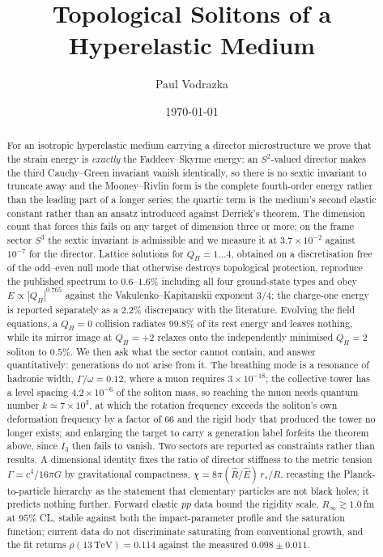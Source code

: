 \documentclass[aps,prd,preprint,nofootinbib,longbibliography]{revtex4-2}
\newcommand{\Qh}{Q_H}
\newcommand{\Ehat}{\hat{E}}
\newcommand{\Rhat}{\hat{R}}
\begin{document}
\title{Topological Solitons of a Hyperelastic Medium}

\author{Paul Vodrazka}

\date{\today}

\begin{abstract}
For an isotropic hyperelastic medium carrying a director microstructure we prove
that the strain energy is \emph{exactly} the Faddeev--Skyrme energy: an
$S^2$-valued director makes the third Cauchy--Green invariant vanish identically,
so there is no sextic invariant to truncate away and the Mooney--Rivlin form is
the complete fourth-order energy rather than the leading part of a longer series;
the quartic term is the medium's second elastic constant rather than an ansatz
introduced against Derrick's theorem. The dimension count that forces this fails on any
target of dimension three or more; on the frame sector $S^3$ the sextic invariant
is admissible and we measure it at $3.7\times10^{-2}$ against $10^{-7}$ for the
director. Lattice solutions for $\Qh=1\ldots4$, obtained on a discretisation free
of the odd--even null mode that otherwise destroys topological protection,
reproduce the published spectrum to $0.6$--$1.6\%$ including all four
ground-state types and obey $E\propto|\Qh|^{0.765}$ against the
Vakulenko--Kapitanskii exponent $3/4$; the charge-one energy is reported
separately as a $2.2\%$ discrepancy with the literature. Evolving the field
equations, a $\Qh=0$ collision radiates $99.8\%$ of its rest energy and leaves
nothing, while its mirror image at $\Qh=+2$ relaxes onto the independently
minimised $\Qh=2$ soliton to $0.5\%$. We then ask what the sector cannot contain,
and answer quantitatively: generations do not arise from it. The breathing mode
is a resonance of hadronic width, $\Gamma/\omega=0.12$, where a muon requires
$3\times10^{-18}$; the collective tower has a level spacing $4.2\times10^{-6}$ of
the soliton mass, so reaching the muon needs quantum number $k\simeq7\times10^3$,
at which the rotation frequency exceeds the soliton's own deformation frequency
by a factor of $66$ and the rigid body that produced the tower no longer exists;
and enlarging the target to carry a generation label forfeits the theorem above,
since $I_3$ then fails to vanish. Two sectors are reported as constraints rather
than results. A dimensional identity fixes the ratio of director stiffness to the
metric tension $\Gamma=c^4/16\pi G$ by gravitational compactness,
$\chi=8\pi(\Rhat/\Ehat)\,r_s/R$, recasting the Planck-to-particle hierarchy as
the statement that elementary particles are not black holes; it predicts nothing
further. Forward elastic $pp$ data bound the rigidity scale,
$R_\infty\gtrsim1.0\,$fm at $95\%$ CL, stable against both the impact-parameter
profile and the saturation function; current data do not discriminate saturating
from conventional growth, and the fit returns $\rho(13\,\mathrm{TeV})=0.114$
against the measured $0.098\pm0.011$.
\end{abstract}
\end{document}
